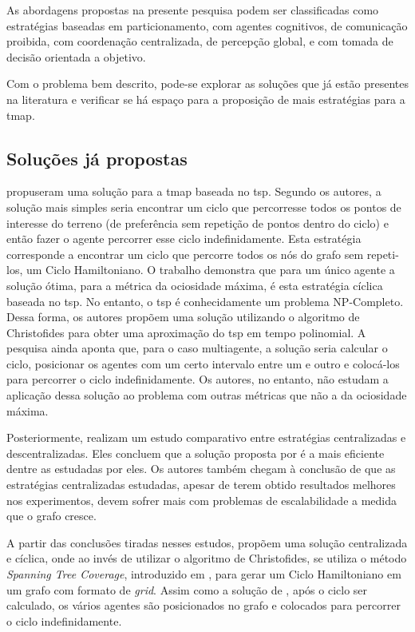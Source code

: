 As abordagens propostas na presente pesquisa podem ser classificadas como 
estratégias baseadas em particionamento, com agentes 
cognitivos, de comunicação proibida, com coordenação 
centralizada, de percepção global, e com tomada de decisão 
orientada a objetivo.

Com o problema bem descrito, pode-se explorar as soluções que já estão presentes 
na literatura e verificar se há espaço para a proposição de mais estratégias 
para a \ac{tmap}.

\subsection{Soluções já propostas}

\citep{Chevaleyre:2004:TAM:1018411.1019013} propuseram uma solução para a 
\ac{tmap} baseada no \ac{tsp}. Segundo os autores, a solução mais simples seria 
encontrar um ciclo que percorresse todos os pontos de interesse do terreno 
(de preferência sem repetição de pontos dentro do ciclo) e então fazer o agente 
percorrer esse ciclo indefinidamente. Esta estratégia corresponde a encontrar um 
ciclo que percorre todos os nós do grafo sem repeti-los, um Ciclo Hamiltoniano. 
O trabalho demonstra que para um único agente a solução ótima, para a métrica da 
ociosidade máxima, é esta estratégia cíclica baseada no \ac{tsp}. No entanto, 
o \ac{tsp} é conhecidamente um problema NP-Completo. Dessa forma, os autores 
propõem uma solução utilizando o algoritmo de Christofides 
\citep{christofides1976worst} para obter uma aproximação do \ac{tsp} em tempo 
polinomial. A pesquisa ainda aponta que, para o caso multiagente, a solução 
seria calcular o ciclo, posicionar os agentes com um certo intervalo entre um e 
outro e colocá-los para percorrer o ciclo indefinidamente. Os autores, no 
entanto, não estudam a aplicação dessa solução ao problema com outras métricas 
que não a da ociosidade máxima.

Posteriormente, \citep{Almeida:2004:AAI} realizam um estudo comparativo entre 
estratégias centralizadas e descentralizadas. Eles concluem que a solução 
proposta por \citep{Chevaleyre:2004:TAM:1018411.1019013} é a mais eficiente 
dentre as estudadas por eles. Os autores também chegam à conclusão de que as 
estratégias centralizadas estudadas, apesar de terem obtido resultados melhores 
nos experimentos, devem sofrer mais com problemas de escalabilidade a medida 
que o grafo cresce.

A partir das conclusões tiradas nesses estudos, \citep{4209122} propõem uma 
solução centralizada e cíclica, onde ao invés de utilizar o algoritmo de 
Christofides, se utiliza o método \textit{Spanning Tree Coverage}, introduzido 
em \citep{Gabriely:2001}, para gerar um Ciclo Hamiltoniano em um grafo com 
formato de \textit{grid}. Assim como a solução de 
\citep{Chevaleyre:2004:TAM:1018411.1019013}, após o ciclo ser calculado, os 
vários agentes são posicionados no grafo e colocados para percorrer o ciclo 
indefinidamente.

